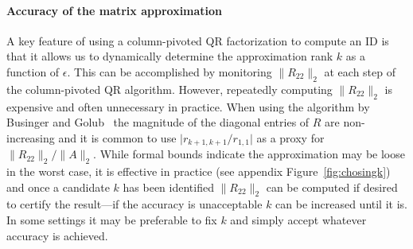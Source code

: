 \paragraph{Accuracy of the matrix approximation}
A key feature of using a column-pivoted QR factorization to compute an ID is that it allows us to dynamically determine the approximation rank $k$ as a function of $\epsilon$. 
This can be accomplished by monitoring $\|R_{22}\|_2$ at each step of the column-pivoted QR algorithm. 
However, repeatedly computing $\|R_{22}\|_2$ is expensive and often unnecessary in practice. 
When using the algorithm by Businger and Golub~\cite{businger1965linear} the magnitude of the diagonal entries of $R$ are non-increasing and it is common to use $\lvert r_{k+1,k+1} / r_{1,1}\rvert$ as a proxy for 
$\|R_{22}\|_2/\|A\|_2$.
While formal bounds indicate the approximation may be loose in the worst case, it is effective in practice (see appendix Figure~\ref{fig:chosingk}) and once a candidate $k$ has been identified $\|R_{22}\|_2$ can be computed if desired to certify the result---if the accuracy is unacceptable $k$ can be increased until it is. 
In some settings it may be preferable to fix $k$ and simply accept whatever accuracy is achieved.



